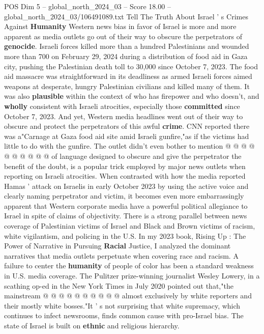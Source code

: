 \begin{textsample}{POS Dim 5 – global\_north\_2024\_03 – Score 18.00 – global\_north\_2024\_03/106491089.txt}  \label{ex:f5_pos_361}
Tell The Truth About Israel ' s Crimes Against \textbf{Humanity} Western news bias in favor of Israel is more and more apparent as media outlets go out of their way to obscure the perpetrators of \textbf{genocide}.
Israeli forces killed more than a hundred Palestinians and wounded more than 700 on February 29, 2024 during a distribution of food aid in Gaza city, pushing the Palestinian death toll to 30,000 since October 7, 2023.
The food aid massacre was straightforward in its deadliness as armed Israeli forces aimed weapons at desperate, hungry Palestinian civilians and killed many of them.
It was also \textbf{plausible} within the context of who has firepower and who doesn't, and \textbf{wholly} consistent with Israeli atrocities, especially those \textbf{committed} since October 7, 2023.
And yet, Western media headlines went out of their way to obscure and protect the perpetrators of this awful \textbf{crime}.
CNN reported there was a"Carnage at Gaza food aid site amid Israeli gunfire,"as if the victims had little to do with the gunfire.
The outlet didn't even bother to mention @ @ @ @ @ @ @ @ @ @ of language designed to obscure and give the perpetrator the benefit of the doubt, is a popular trick employed by major news outlets when reporting on Israeli atrocities.
When contrasted with how the media reported Hamas ' attack on Israelis in early October 2023 by using the active voice and clearly naming perpetrator and victim, it becomes even more embarrassingly apparent that Western corporate media have a powerful political allegiance to Israel in spite of claims of objectivity.
There is a strong parallel between news coverage of Palestinian victims of Israel and Black and Brown victims of racism, white vigilantism, and policing in the U.S.
In my 2023 book, Rising Up : The Power of Narrative in Pursuing \textbf{Racial} Justice, I analyzed the dominant narratives that media outlets perpetuate when covering race and racism.
A failure to center the \textbf{humanity} of people of color has been a standard weakness in U.S. media coverage.
The Pulitzer prize-winning journalist Wesley Lowery, in a scathing op-ed in the New York Times in July 2020 pointed out that,"the mainstream @ @ @ @ @ @ @ @ @ @ almost exclusively by white reporters and their mostly white bosses."It ' s not surprising that white supremacy, which continues to infect newsrooms, finds common cause with pro-Israel bias.
The state of Israel is built on \textbf{ethnic} and religious hierarchy.

\end{textsample}
